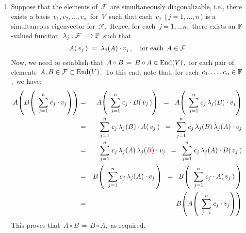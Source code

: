 \begin{enumerate}
\item
    Suppose that the elements of \,$\mathcal{F}$\, are simultaneously diagonalizable, i.e.,
    there exists a basis \,$v_{1}, v_{2}, \ldots, v_{n}$\, for \,$V$\, such that
    each \,$v_{j}$\, (\,$j = 1, \ldots, n$\,) is a simultaneous eigenvector for \,$\mathcal{F}$.\,
    Hence, for each \,$j = 1, \ldots n$,\, there exists an $\mathbb{F}$-valued function
    \,$\lambda_{j} : \mathcal{F} \longrightarrow \mathbb{F}$\, such that
    \begin{equation*}
    A(\,v_{j}\,)
    \; = \;
        \lambda_{j}(A) \cdot v_{j}\,,
    \quad
    \textnormal{for each \,$A \in \mathcal{F}$}
    \end{equation*}
    Now, we need to establish that
    \,$A \circ B \,=\, B \circ A \in \textnormal{End}(V)$,\,
    for each pair of elements \,$A, B \in \mathcal{F} \subset \textnormal{End}(V)$.\,
    To this end, note that, for each \,$c_{1}, \ldots, c_{n} \in \mathbb{F}$,\, we have:
    \begin{eqnarray*}
    A\!\left(B\!\left(\;\,
        \overset{n}{\underset{j=1}{\sum}}\;c_{j} \cdot v_{j}
        \right)\right)
    & = &
	    A\!\left(\;\,
	        \overset{n}{\underset{j=1}{\sum}}\;c_{j} \cdot B(\,v_{j}\,)
	        \right)
	\;\; = \;\;
	    A\!\left(\;\,
	        \overset{n}{\underset{j=1}{\sum}}\;c_{j}\,\lambda_{j}(B) \cdot v_{j}
	        \right)
    \\
    & = &
	    \overset{n}{\underset{j=1}{\sum}}\;c_{j}\,\lambda_{j}(B) \cdot A(\,v_{j}\,)
	\;\; = \;\;
	    \overset{n}{\underset{j=1}{\sum}}\;c_{j}\,\lambda_{j}(B)\,\lambda_{j}(A) \cdot v_{j}
    \\
    & = &
	    \overset{n}{\underset{j=1}{\sum}}\;
	        c_{j}\,
	        \lambda_{j}({\color{red}A})\,
	        \lambda_{j}({\color{red}B})
	        \cdot
	        v_{j}
	\;\; = \;\;
	    \overset{n}{\underset{j=1}{\sum}}\;
	        c_{j}\,
	        \lambda_{j}(A)\cdot
	        B\!\left(\,v_{j}\,\right)
    \\
    & = &
	    B\!\left(\;\;
	    \overset{n}{\underset{j=1}{\sum}}\;
	        c_{j}\,\lambda_{j}(A) \cdot v_{j}
	    \,\right)
	\;\; = \;\;
	    B\!\left(\;\;
	    \overset{n}{\underset{j=1}{\sum}}\;
	        c_{j} \cdot A(\,v_{j}\,)
	    \,\right)
    \\
    & = &
    B\!\left(A\!\left(\;\,
        \overset{n}{\underset{j=1}{\sum}}\;c_{j} \cdot v_{j}
        \right)\right)
    \end{eqnarray*}
    This proves that \,$A \circ B \,=\, B \circ A$,\, as required.

\end{enumerate}
